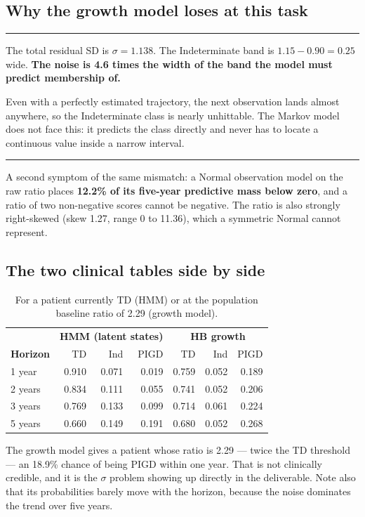 \documentclass[11pt,a4paper]{article}
\newenvironment{keypoint}
  {\begin{center}\begin{minipage}{0.94\textwidth}%
   \vspace{4pt}\hrule\vspace{7pt}\small}
  {\vspace{7pt}\hrule\vspace{4pt}\end{minipage}\end{center}}
\begin{document}
\subsection{Why the growth model loses at this task}

\begin{keypoint}
The total residual SD is $\sigma = 1.138$. The Indeterminate band is
$1.15 - 0.90 = 0.25$ wide. \textbf{The noise is 4.6 times the width of the band
the model must predict membership of.}

Even with a perfectly estimated trajectory, the next observation lands almost
anywhere, so the Indeterminate class is nearly unhittable. The Markov model
does not face this: it predicts the class directly and never has to locate a
continuous value inside a narrow interval.
\end{keypoint}

\noindent
A second symptom of the same mismatch: a Normal observation model on the raw
ratio places \textbf{12.2\% of its five-year predictive mass below zero}, and a
ratio of two non-negative scores cannot be negative. The ratio is also strongly
right-skewed (skew 1.27, range 0 to 11.36), which a symmetric Normal cannot
represent.

\subsection{The two clinical tables side by side}

\begin{table}[H]
\centering
\begin{tabular}{@{}lrrr|rrr@{}}
\toprule
& \multicolumn{3}{c|}{\textbf{HMM (latent states)}} & \multicolumn{3}{c}{\textbf{HB growth}} \\
\textbf{Horizon} & TD & Ind & PIGD & TD & Ind & PIGD \\
\midrule
1 year  & 0.910 & 0.071 & 0.019 & 0.759 & 0.052 & 0.189 \\
2 years & 0.834 & 0.111 & 0.055 & 0.741 & 0.052 & 0.206 \\
3 years & 0.769 & 0.133 & 0.099 & 0.714 & 0.061 & 0.224 \\
5 years & 0.660 & 0.149 & 0.191 & 0.680 & 0.052 & 0.268 \\
\bottomrule
\end{tabular}
\caption{For a patient currently TD (HMM) or at the population baseline ratio of
2.29 (growth model).}
\end{table}

\noindent
The growth model gives a patient whose ratio is 2.29 --- twice the TD threshold
--- an 18.9\% chance of being PIGD within one year. That is not clinically
credible, and it is the $\sigma$ problem showing up directly in the deliverable.
Note also that its probabilities barely move with the horizon, because the
noise dominates the trend over five years.
\end{document}

